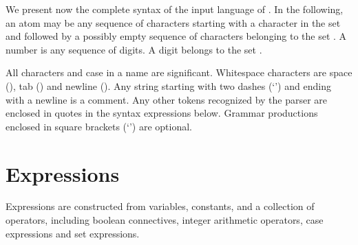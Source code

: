 
We present now the complete syntax of the input language of \nusmv. In
the following, an atom may be any sequence of characters starting with
a character in the set  and followed by a possibly
empty sequence of characters belonging to the set
.
A number is any sequence of digits. A digit belongs to the set
.

All characters and case in a name are significant. Whitespace
characters are space (\spc), tab (\tab) and newline (\ret). Any string
 starting with two dashes
(`\code{--}') and ending with a newline is a comment. Any other tokens
recognized by the parser are enclosed in quotes in the syntax
expressions below. Grammar productions enclosed in square brackets
(`\code{[]}') are optional.


\section{Expressions}
\label{expressions}
%
Expressions are constructed from variables, constants, and a
collection of operators, including boolean connectives, integer
arithmetic operators, case expressions and set expressions.

